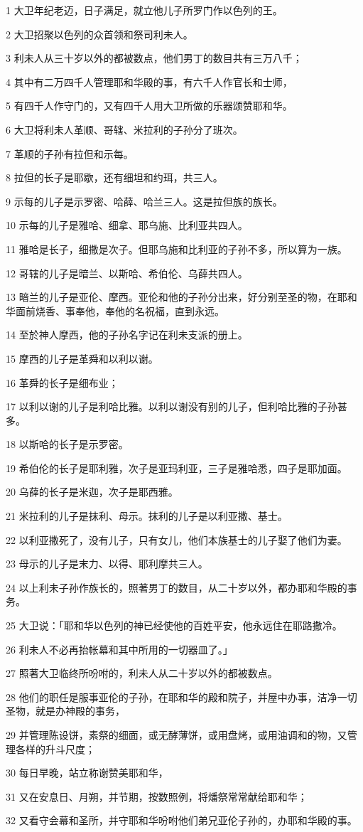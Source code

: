 \par 1 大卫年纪老迈，日子满足，就立他儿子所罗门作以色列的王。
\par 2 大卫招聚以色列的众首领和祭司利未人。
\par 3 利未人从三十岁以外的都被数点，他们男丁的数目共有三万八千；
\par 4 其中有二万四千人管理耶和华殿的事，有六千人作官长和士师，
\par 5 有四千人作守门的，又有四千人用大卫所做的乐器颂赞耶和华。
\par 6 大卫将利未人革顺、哥辖、米拉利的子孙分了班次。
\par 7 革顺的子孙有拉但和示每。
\par 8 拉但的长子是耶歇，还有细坦和约珥，共三人。
\par 9 示每的儿子是示罗密、哈薛、哈兰三人。这是拉但族的族长。
\par 10 示每的儿子是雅哈、细拿、耶乌施、比利亚共四人。
\par 11 雅哈是长子，细撒是次子。但耶乌施和比利亚的子孙不多，所以算为一族。
\par 12 哥辖的儿子是暗兰、以斯哈、希伯伦、乌薛共四人。
\par 13 暗兰的儿子是亚伦、摩西。亚伦和他的子孙分出来，好分别至圣的物，在耶和华面前烧香、事奉他，奉他的名祝福，直到永远。
\par 14 至於神人摩西，他的子孙名字记在利未支派的册上。
\par 15 摩西的儿子是革舜和以利以谢。
\par 16 革舜的长子是细布业；
\par 17 以利以谢的儿子是利哈比雅。以利以谢没有别的儿子，但利哈比雅的子孙甚多。
\par 18 以斯哈的长子是示罗密。
\par 19 希伯伦的长子是耶利雅，次子是亚玛利亚，三子是雅哈悉，四子是耶加面。
\par 20 乌薛的长子是米迦，次子是耶西雅。
\par 21 米拉利的儿子是抹利、母示。抹利的儿子是以利亚撒、基士。
\par 22 以利亚撒死了，没有儿子，只有女儿，他们本族基士的儿子娶了他们为妻。
\par 23 母示的儿子是末力、以得、耶利摩共三人。
\par 24 以上利未子孙作族长的，照著男丁的数目，从二十岁以外，都办耶和华殿的事务。
\par 25 大卫说：「耶和华以色列的神已经使他的百姓平安，他永远住在耶路撒冷。
\par 26 利未人不必再抬帐幕和其中所用的一切器皿了。」
\par 27 照著大卫临终所吩咐的，利未人从二十岁以外的都被数点。
\par 28 他们的职任是服事亚伦的子孙，在耶和华的殿和院子，并屋中办事，洁净一切圣物，就是办神殿的事务，
\par 29 并管理陈设饼，素祭的细面，或无酵薄饼，或用盘烤，或用油调和的物，又管理各样的升斗尺度；
\par 30 每日早晚，站立称谢赞美耶和华，
\par 31 又在安息日、月朔，并节期，按数照例，将燔祭常常献给耶和华；
\par 32 又看守会幕和圣所，并守耶和华吩咐他们弟兄亚伦子孙的，办耶和华殿的事。

